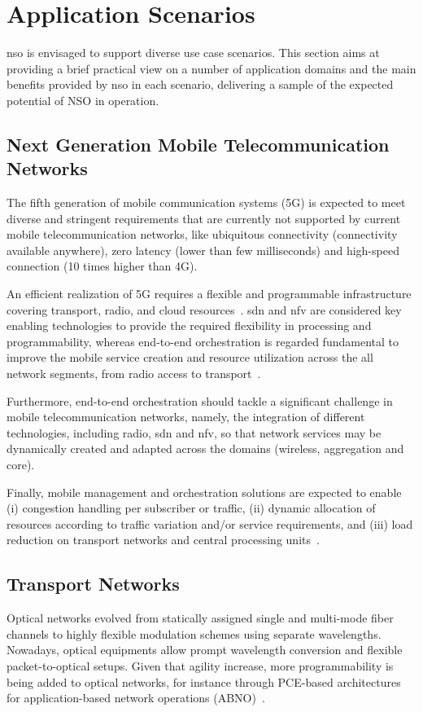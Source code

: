 \section{Application Scenarios}
\label{sec:scneario}

\gls{nso} is envisaged to support diverse use case scenarios. This section aims at providing a brief practical view on a number of application domains and the main benefits provided by \gls{nso} in each scenario, delivering a sample of the expected potential of NSO in operation. 


\subsection{Next Generation Mobile Telecommunication Networks}

The fifth generation of mobile communication systems (5G) is expected to meet diverse and stringent requirements that are currently not supported by current mobile telecommunication networks, like ubiquitous connectivity (connectivity available anywhere), zero latency (lower than few milliseconds) and high-speed connection (10 times higher than 4G).

An efficient realization of 5G requires a flexible and programmable infrastructure covering transport, radio, and cloud resources~\cite{NGMN:5G:2017}. \gls{sdn} and \gls{nfv} are considered key enabling technologies to provide the required flexibility in processing and programmability, whereas end-to-end orchestration is regarded fundamental  to improve the mobile service creation and resource utilization across the all network segments, from radio access  to transport~\cite{rostami-ran-transport-17}.

Furthermore, end-to-end orchestration should tackle  a significant challenge in mobile telecommunication networks, namely, the integration of different technologies, including radio, \gls{sdn} and \gls{nfv}, so that network services may be dynamically created and adapted across the domains (wireless, aggregation and core). 

Finally, mobile management and orchestration solutions are expected to enable (i) congestion handling per subscriber or traffic, (ii) dynamic allocation of resources according to traffic variation and/or service requirements, and (iii) load reduction on transport networks and central processing units~\cite{EricssonInc.2015}. 

\subsection{Transport Networks}
Optical networks evolved from statically assigned single and multi-mode fiber channels to highly flexible modulation schemes using separate wavelengths. Nowadays, optical equipments allow prompt wavelength conversion and flexible packet-to-optical setups. Given that agility increase, more programmability is being added to optical networks, for instance through PCE-based architectures for application-based network operations (ABNO)~\cite{RFC7491}. 

